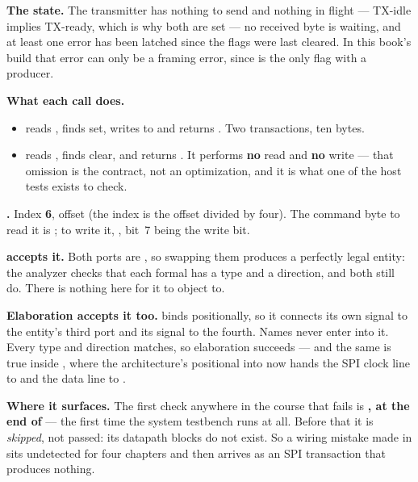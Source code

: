 \textbf{The state.} The transmitter has nothing to send and nothing in flight --- TX-idle implies
TX-ready, which is why both are set --- no received byte is waiting, and at least one error has been
latched since the flags were last cleared. In this book's build that error can only be a framing
error, since  is the only flag with a producer.

\textbf{What each call does.}
\begin{itemize}
  \item {} reads , finds  set, writes  to
     and returns . Two transactions, ten bytes.
  \item {} reads , finds  clear, and returns
    . It performs \textbf{no}  read and \textbf{no}  write
    --- that omission is the contract, not an optimization, and it is what one of the host tests
    exists to check.
\end{itemize}

\textbf{.} Index \textbf{6}, offset \textbf{} (the index is the offset
divided by four). The command byte to read it is \textbf{}; to write it,
\textbf{}, bit~7 being the write bit. 

\textbf{ accepts it.} Both ports are , so swapping them produces a
perfectly legal entity: the analyzer checks that each formal has a type and a direction, and both
still do. There is nothing here for it to object to. 

\textbf{Elaboration accepts it too.}  binds positionally, so it connects its own
 signal to the entity's third port and its  signal to the fourth. Names never
enter into it. Every type and direction matches, so elaboration succeeds --- and the same is true
inside , where the architecture's positional  into 
now hands the SPI clock line to  and the data line to .

\textbf{Where it surfaces.} The first check anywhere in the course that fails is
\textbf{, at the end of } --- the first time the system testbench runs
at all. Before that it is \emph{skipped}, not passed: its datapath blocks do not exist. So a wiring
mistake made in  sits undetected for four chapters and then arrives as an SPI transaction
that produces nothing. 


